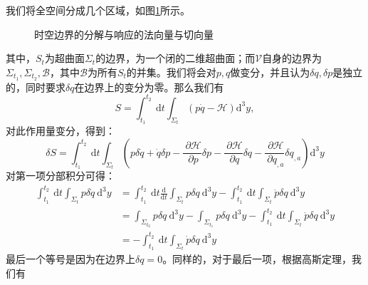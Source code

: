\documentclass[hyperref, UTF8, a4paper]{ctexart}
\begin{document}
我们将全空间分成几个区域，如图\ref{fig:foilation_of_the_boundary}所示。

\begin{figure}
	\centering
	
	\caption{时空边界的分解与响应的法向量与切向量}
	\label{fig:foilation_of_the_boundary}
\end{figure}

其中，$S_{t}$为超曲面$\Sigma _{t}$的边界，为一个闭的二维超曲面；而$\mathscr{V}$自身的边界为$\Sigma _{t_{1}} ,\Sigma _{t_{2}} ,\mathscr{B}$，其中$\mathscr{B}$为所有$S_{t}$的并集。我们将会对$p,q$做变分，并且认为$\delta q,\delta p$是独立的，同时要求$\delta q$在边界上的变分为零。那么我们有
\begin{equation*}
	S=\int _{t_{1}}^{t_{2}} \ \mathrm{d} t\int _{\Sigma _{t}} (p\dot{q} -\mathcal{H} )\mathrm{d}^{3} y,
\end{equation*}
对此作用量变分，得到：
\begin{equation*}
	\delta S=\int _{t_{1}}^{t_{2}} \ \mathrm{d} t\int _{\Sigma _{t}}\left( p\delta \dot{q} +\dot{q} \delta p-\frac{\mathcal{\ \partial H}}{\ \partial p} \delta p-\frac{\mathcal{\ \partial H}}{\ \partial q} \delta q-\frac{\mathcal{\ \partial H}}{\ \partial q_{,a}} \delta q_{,a}\right)\mathrm{d}^{3} y
\end{equation*}
对第一项分部积分可得：
\begin{equation*}
	\begin{aligned}
		\int _{t_{1}}^{t_{2}}\mathrm{\ d} t\int _{\Sigma _{t}} p\delta \dot{q}\mathrm{\ d}^{3} y & =\int _{t_{1}}^{t_{2}}\mathrm{\ d} t\frac{\mathrm{d}}{\mathrm{d} t}\int _{\Sigma _{t}} p\delta q\mathrm{\ d}^{3} y-\int _{t_{1}}^{t_{2}}\mathrm{\ d} t\int _{\Sigma _{t}}\dot{p} \delta q\mathrm{\ d}^{3} y\\
		& =\int _{\Sigma _{t_{2}}} p\delta q\mathrm{\ d}^{3} y-\int _{\Sigma _{t_{1}}} p\delta q\mathrm{\ d}^{3} y-\int _{t_{1}}^{t_{2}}\mathrm{\ d} t\int _{\Sigma _{t}}\dot{p} \delta q\mathrm{\ d}^{3} y\\
		& =-\int _{t_{1}}^{t_{2}}\mathrm{\ d} t\int _{\Sigma _{t}}\dot{p} \delta q\mathrm{\ d}^{3} y
	\end{aligned}
\end{equation*}
最后一个等号是因为在边界上$\delta q=0$。同样的，对于最后一项，根据高斯定理，我们有
\end{document}
